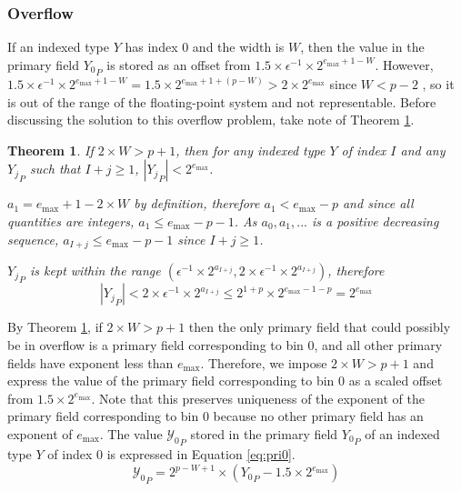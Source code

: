 \documentclass[12pt]{article}
\providecommand{\max}{\ensuremath{\text{max}}}
\theoremstyle{plain}
\newtheorem{thm}{Theorem}[section]
\numberwithin{equation}{section}
\begin{document}
    \subsubsection{Overflow}
      \label{sec:indexed_implementation_overflow}
      If an indexed type $Y$ has index 0 and the width is $W$, then the value in the primary field ${Y_0}_P$ is stored as an offset from $1.5\times\epsilon^{-1}\times2^{e_{\max} + 1 - W}$. However, $1.5\times\epsilon^{-1}\times2^{e_{\max} + 1 - W} = 1.5 \times 2^{e_{\max} + 1 + (p - W)} > 2 \times 2^{e_{\max}}$ since $W < p - 2$ \cite{repsum}, so it is out of the range of the floating-point system and not representable. Before discussing the solution to this overflow problem, take note of Theorem \ref{thm:overflow}.
      \begin{thm}
        If $2\times W > p + 1$, then for any indexed type $Y$ of index $I$ and any ${Y_j}_P$ such that $I + j \geq 1$, $|{Y_j}_P| < 2^{e_{\max}}$.

        $a_1 = e_{\max} + 1 - 2\times W$ by definition, therefore $a_1 < e_{\max} - p$ and since all quantities are integers, $a_1 \leq e_{\max} - p - 1$. As $a_0, a_1, ...$ is a positive decreasing sequence, $a_{I + j} \leq e_{\max} - p - 1$ since $I + j \geq 1$.

        ${Y_j}_P$ is kept within the range $(\epsilon^{-1} \times 2^{a_{I + j}}, 2 \times \epsilon^{-1} \times 2^{a_{I + j}})$, therefore
        \begin{equation*}
        |{Y_j}_P| < 2 \times \epsilon^{-1} \times 2^{a_{I + j}} \leq 2^{1 + p} \times 2^{e_{\max} - 1 - p} = 2^{e_{\max}}
        \end{equation*}

        \label{thm:overflow}
      \end{thm}
      By Theorem \ref{thm:overflow}, if $2\times W > p + 1$ then the only primary field that could possibly be in overflow is a primary field corresponding to bin 0, and all other primary fields have exponent less than $e_{\max}$. Therefore, we impose $2\times W > p + 1$ and express the value of the primary field corresponding to bin 0 as a scaled offset from $1.5\times2^{e_{\max}}$. Note that this preserves uniqueness of the exponent of the primary field corresponding to bin 0 because no other primary field has an exponent of $e_{\max}$. The value ${\mathcal{Y}_0}_P$ stored in the primary field ${Y_0}_P$ of an indexed type $Y$ of index 0 is expressed in Equation \ref{eq:pri0}.
      \begin{equation}
        {\mathcal{Y}_0}_P = 2^{p - W + 1}\times({Y_0}_P - 1.5\times2^{e_{\max}})
        \label{eq:pri0}
      \end{equation}
\end{document}
